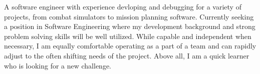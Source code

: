 \begin{cvletter}

A software engineer with experience devloping and debugging for a variety of projects, from combat simulators to mission planning software. Currently seeking a position in Software Engineering where my development background and strong problem solving skills will be well utilized. While capable and independent when necessary, I am equally comfortable operating as a part of a team and can rapidly adjust to the often shifting needs of the project. Above all, I am a quick learner who is looking for a new challenge.
\end{cvletter}


